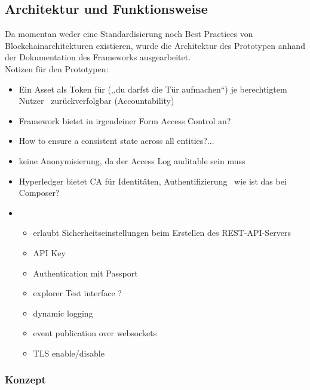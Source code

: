 \subsection{Architektur und Funktionsweise}
\label{sec:prototype_arch} 
    Da momentan weder eine Standardisierung noch Best Practices von Blockchainarchitekturen existieren, wurde die Architektur des Prototypen anhand der Dokumentation des Frameworks\cite{ComposerDocs}  ausgearbeitet.
    \medskip\\
    Notizen für den Prototypen:
    \begin{itemize}[noitemsep]
        \item Ein Asset als Token für (,,du darfst die Tür aufmachen``) je berechtigtem Nutzer \textrightarrow\ zurückverfolgbar (Accountability)
        \item Framework bietet in irgendeiner Form Access Control an?
        \item How to ensure a consistent state across all entities?...
        \item keine Anonymisierung, da der Access Log auditable sein muss
        \item Hyperledger bietet CA für Identitäten, Authentifizierung \textrightarrow\ wie ist das bei Composer?
        \item \begin{itemize}
            \item erlaubt Sicherheitseinstellungen beim Erstellen des REST-API-Servers
            \item API Key
            \item Authentication mit Passport
            \item explorer Test interface ?
            \item dynamic logging
            \item event publication over websockets
            \item TLS enable/\-disable
        \end{itemize}
    \end{itemize}
    
    \subsubsection{Konzept}
